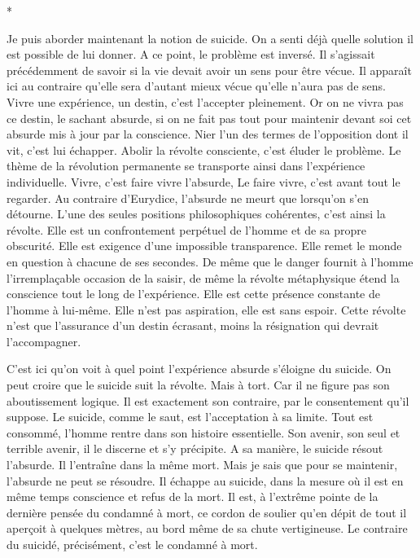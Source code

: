 \documentclass{book}
\begin{document}
\begin{center}
*
\end{center}

Je puis aborder maintenant la notion de suicide. On a senti déjà quelle solution il est possible de lui donner. A ce point, le problème est inversé. Il s'agissait précédemment de savoir si la vie devait avoir un sens pour être vécue. Il apparaît ici au contraire qu'elle sera d'autant mieux vécue qu'elle n'aura pas de sens. Vivre une expérience, un destin, c'est l'accepter pleinement. Or on ne vivra pas ce destin, le sachant absurde, si on ne fait pas tout pour maintenir devant soi cet absurde mis à jour par la conscience. Nier l'un des termes de l'opposition dont il vit, c'est lui échapper. Abolir la révolte consciente, c'est éluder le problème. Le thème de la révolution permanente se transporte ainsi dans l'expérience individuelle. Vivre, c'est faire vivre l'absurde, Le faire vivre, c'est avant tout le regarder. Au contraire d'Eurydice, l'absurde ne meurt que lorsqu'on s'en détourne. L'une des seules positions philosophiques cohérentes, c'est ainsi la révolte. Elle est un confrontement perpétuel de l'homme et de sa propre obscurité. Elle est exigence d'une impossible transparence. Elle remet le monde en question à chacune de ses secondes. De même que le danger fournit à l'homme l'irremplaçable occasion de la saisir, de même la révolte métaphysique étend la conscience tout le long de l'expérience. Elle est cette présence constante de l'homme à lui‑même. Elle n'est pas aspiration, elle est sans espoir. Cette révolte n'est que l'assurance d'un destin écrasant, moins la résignation qui devrait l’accompagner.

C'est ici qu'on voit à quel point l'expérience absurde s'éloigne du suicide. On peut croire que le suicide suit la révolte. Mais à tort. Car il ne figure pas son aboutissement logique. Il est exactement son contraire, par le consentement qu'il suppose. Le suicide, comme le saut, est l'acceptation à sa limite. Tout est consommé, l'homme rentre dans son histoire essentielle. Son avenir, son seul et terrible avenir, il le discerne et s'y précipite. A sa manière, le suicide résout l'absurde. Il l'entraîne dans la même mort. Mais je sais que pour se maintenir, l'absurde ne peut se résoudre. Il échappe au suicide, dans la mesure où il est en même temps conscience et refus de la mort. Il est, à l'extrême pointe de la dernière pensée du condamné à mort, ce cordon de soulier qu'en dépit de tout il aperçoit à quelques mètres, au bord même de sa chute vertigineuse. Le contraire du suicidé, précisément, c'est le condamné à mort.
\end{document}
